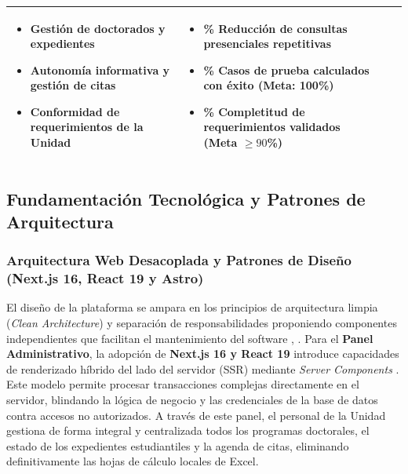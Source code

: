\begin{table}[H]
\begin{tabularx}{\linewidth}{>{\bfseries\raggedright\arraybackslash}p{3.2cm} >{\raggedright\arraybackslash}X >{\raggedright\arraybackslash}X >{\raggedright\arraybackslash}X}
\begin{itemize}[leftmargin=*,noitemsep,topsep=0pt,partopsep=0pt,parsep=0pt]
            \item Gestión de doctorados y expedientes
            \item Autonomía informativa y gestión de citas
            \item Conformidad de requerimientos de la Unidad
        \end{itemize} & 
        \begin{itemize}[leftmargin=*,noitemsep,topsep=0pt,partopsep=0pt,parsep=0pt]
            \item \% Reducción de consultas presenciales repetitivas
            \item \% Casos de prueba calculados con éxito (Meta: 100\%)
            \item \% Completitud de requerimientos validados (Meta $\ge 90$\%)
        \end{itemize} \\
        \bottomrule
    \end{tabularx}
\end{table}

\subsection{Fundamentación Tecnológica y Patrones de Arquitectura}

\subsubsection{Arquitectura Web Desacoplada y Patrones de Diseño (Next.js 16, React 19 y Astro)}

El diseño de la plataforma se ampara en los principios de arquitectura limpia (\textit{Clean Architecture}) y separación de responsabilidades proponiendo componentes independientes que facilitan el mantenimiento del software \cite{martin_clean}, \cite{gamma_patterns}. Para el \textbf{Panel Administrativo}, la adopción de \textbf{Next.js 16 y React 19} introduce capacidades de renderizado híbrido del lado del servidor (SSR) mediante \textit{Server Components} \cite{vercel_nextjs}. Este modelo permite procesar transacciones complejas directamente en el servidor, blindando la lógica de negocio y las credenciales de la base de datos contra accesos no autorizados. A través de este panel, el personal de la Unidad gestiona de forma integral y centralizada todos los programas doctorales, el estado de los expedientes estudiantiles y la agenda de citas, eliminando definitivamente las hojas de cálculo locales de Excel.

